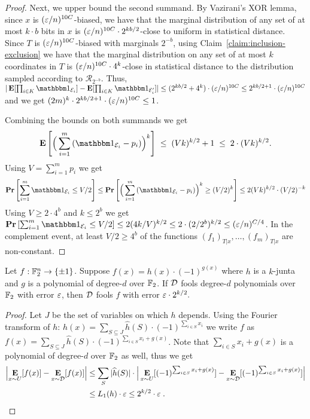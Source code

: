 \begin{proof}
	Next, we upper bound the second summand. By Vazirani's XOR lemma, since $x$ is $(\varepsilon/n)^{10C}$-biased, we have that the marginal distribution of
	 any set of at most $k\cdot b$ bits in $x$ is $(\varepsilon/n)^{10C} \cdot 2^{kb/2}$-close to uniform in statistical distance.
	Since $T$ is $(\varepsilon/n)^{10C}$-biased with marginals $2^{-b}$, using Claim~\ref{claim:inclusion-exclusion} we have that the marginal distribution on any set of at most $k$ coordinates in $T$ is $(\varepsilon/n)^{10C} \cdot 4^{k}$-close in statistical distance to the distribution sampled according to $\mathcal{R}_{2^{-b}}$.
	Thus, $|\E[\prod_{i\in K} {\one_{\cE_i}}] - \E[\prod_{i\in K} {\one_{\cE'_i}}]| \le (2^{kb/2} +4^{k}) \cdot (\eps/n)^{10C} \le 2^{kb/2+1} \cdot (\eps/n)^{10C}$ and we get 
	$(2m)^{k} \cdot 2^{kb/2+1} \cdot (\varepsilon/n)^{10C}\le 1$.
	
	Combining the bounds on both summands we get
	$$
	\E\left[\Big(\sum_{i=1}^{m}{(\one_{\cE_i}-p_i)}\Big)^k\right] 
	\;\le\; 
	(Vk)^{k/2} + 1 
	\;\le\; 
	2\cdot (Vk)^{k/2}.
	$$
	Using $V = \sum_{i=1}^{m} p_i$ we get 
	$$\Pr\left[\sum_{i=1}^{m}\one_{\cE_i} \le V/2 \right] \le 
	 \Pr\left[\Big(\sum_{i=1}^{m}{(\one_{\cE_i}-p_i)}\Big)^k  \ge (V/2)^k \right]  \le 2(Vk)^{k/2} \cdot (V/2)^{-k}$$
Using $V \ge 2\cdot 4^b$ and $k\le 2^b$ we get $\Pr\left[\sum_{i=1}^{m}\one_{\cE_i} \le V/2 \right] \le 2(4k/V)^{k/2} \le 2\cdot(2/2^b)^{k/2}\le  (\eps/n)^{C/4}$.
In the complement event, at least $V/2 \ge 4^b$ of the functions $(f_1)_{T|x}, \ldots, (f_m)_{T|x}$ are non-constant.
\end{proof}


\begin{lemma}\label{lemma:low-deg}
Let $f: {\mathbb{F}}_2^n \to {\{\pm1\}}$.
Suppose $f(x) = h(x) \cdot (-1)^{g(x)}$ where $h$ is a $k$-junta 
and $g$ is a polynomial of degree-$d$ over ${\mathbb{F}}_2$.
	If ${\mathcal{D}}$ fools degree-$d$ polynomials over ${\mathbb{F}}_2$ with error $\varepsilon$, then ${\mathcal{D}}$ fools $f$ with error $\varepsilon \cdot 2^{k/2}.$
\end{lemma}
\begin{proof}
Let $J$ be the set of variables on which $h$ depends.
Using the Fourier transform of $h$:
$h(x) = \sum_{S \subseteq J} \hat{h}(S) \cdot (-1)^{\sum_{i\in S} x_i}$
we write $f$ as
$f(x) = \sum_{S \subseteq J} \hat{h}(S) \cdot (-1)^{\sum_{i\in S} x_i + g(x)}$.
Note that $\sum_{i\in S} x_i + g(x)$ is a polynomial of degree-$d$ over ${\mathbb{F}}_2$ as well, thus we get
\begin{align*} \left|\mathop{\bf E\/}_{x\sim U}[f(x)]-\mathop{\bf E\/}_{x\sim {\mathcal{D}}}[f(x)]\right| 
&\le \sum_{S}|\widehat{h}(S)| \cdot 
\Big|\mathop{\bf E\/}_{x\sim U}[(-1)^{\sum_{i\in S} x_i + g(x)}] - \mathop{\bf E\/}_{x\sim {\mathcal{D}}}[(-1)^{\sum_{i\in S} x_i + g(x)}]\Big| \\
&\le L_1(h) \cdot \varepsilon \le 2^{k/2} \cdot \varepsilon\;.\qedhere\end{align*}
\end{proof}


